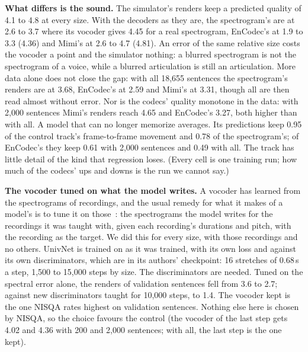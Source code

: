 \documentclass[10pt,a4paper,twocolumn]{article}
\begin{document}
\textbf{What differs is the sound.} The simulator's renders keep a predicted quality of 4.1 to
4.8 at every size. With the decoders as they are, the spectrogram's are at 2.6 to 3.7 where its vocoder gives 4.45 for a real spectrogram, EnCodec's at 1.9 to 3.3 (4.36) and Mimi's at 2.6 to 4.7 (4.81). An error of the same relative size costs the
vocoder a point and the simulator nothing: a blurred spectrogram is not the spectrogram of a
voice, while a blurred articulation is still an articulation. More data alone does not
close the gap: with all 18,655 sentences the spectrogram's renders are at 3.68, EnCodec's at 2.59
and Mimi's at 3.31, though all are then read almost without error. Nor is the codecs' quality
monotone in the data: with 2,000 sentences Mimi's renders reach 4.65 and EnCodec's 3.27, both
higher than with all. A model that can no longer memorize averages. Its predictions keep 0.95
of the control track's frame-to-frame movement and 0.78 of the spectrogram's; of EnCodec's they
keep 0.61 with 2,000 sentences and 0.49 with all. The track has little detail of the kind that
regression loses. (Every cell is one training run; how much of the codecs' ups and downs is the
run we cannot say.)

\textbf{The vocoder tuned on what the model writes.} A vocoder has learned from the
spectrograms of recordings, and the usual remedy for what it makes of a model's is to tune it
on those~\cite{tacotron2,hifigan}: the spectrograms the model writes for the recordings it
was taught with, given each recording's durations and pitch, with the recording as the target.
We did this for every size, with those recordings and no others. UnivNet is trained on as it
was trained, with its own loss and against its own discriminators, which are in its authors'
checkpoint: 16 stretches of 0.68\,s a step, 1,500 to 15,000 steps by size. The discriminators
are needed. Tuned on the spectral error alone, the renders of validation sentences fell from
3.6 to 2.7; against new discriminators taught for 10,000 steps, to 1.4. The vocoder kept is the
one NISQA rates highest on validation sentences. Nothing else here is chosen by NISQA, so the
choice favours the control (the vocoder of the last step gets 4.02 and 4.36 with 200 and 2,000
sentences; with all, the last step is the one kept).
\end{document}
